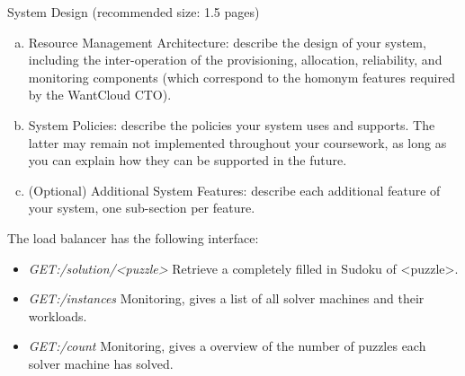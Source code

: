 \documentclass[twoside]{article}
\begin{document}
\begin{multicols}{2}
System Design (recommended size: 1.5 pages)
\begin{enumerate}[(a)]
\item Resource Management Architecture: describe the design of your system,
including the inter-operation of the provisioning, allocation, reliability, and monitoring components (which correspond to the homonym features required by the WantCloud CTO).
\item System Policies: describe the policies your system uses and supports. The latter may remain not implemented throughout your coursework, as long as you can explain how they can be supported in the future.
\item (Optional) Additional System Features: describe each additional feature of your system, one sub-section per feature.
\end{enumerate}

The load balancer has the following interface:
\begin{itemize}
\item \emph{GET:/solution/<puzzle>} Retrieve a completely filled in Sudoku of <puzzle>.
\item \emph{GET:/instances} Monitoring, gives a list of all solver machines and their workloads.
\item \emph{GET:/count} Monitoring, gives a overview of the number of puzzles each solver machine has solved.
\end{itemize}


\end{multicols}
\end{document}

